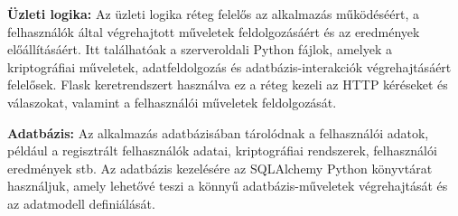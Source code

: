 \textbf{Üzleti logika:} Az üzleti logika réteg felelős az alkalmazás működéséért, a felhasználók által végrehajtott műveletek feldolgozásáért és az eredmények előállításáért. Itt találhatóak a szerveroldali Python fájlok, amelyek a kriptográfiai műveletek, adatfeldolgozás és adatbázis-interakciók végrehajtásáért felelősek. Flask keretrendszert használva ez a réteg kezeli az HTTP kéréseket és válaszokat, valamint a felhasználói műveletek feldolgozását.

\textbf{Adatbázis:} Az alkalmazás adatbázisában tárolódnak a felhasználói adatok, például a regisztrált felhasználók adatai, kriptográfiai rendszerek, felhasználói eredmények stb. Az adatbázis kezelésére az SQLAlchemy Python könyvtárat használjuk, amely lehetővé teszi a könnyű adatbázis-műveletek végrehajtását és az adatmodell definiálását.

